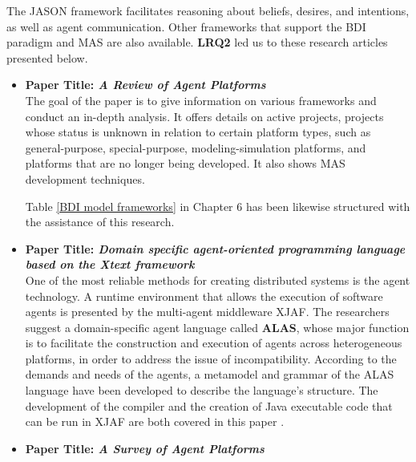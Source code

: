 \vspace{.5cm}

The JASON framework facilitates reasoning about beliefs, desires, and intentions, as well as agent communication. Other frameworks that support the BDI paradigm and MAS are also available. \textbf{LRQ2} led us to these research articles presented below.

\begin{itemize}[label={}]

\item \textbf{Paper Title: \textit{A Review of Agent Platforms}}\\

The goal of the paper \cite{review} is to give information on various frameworks and conduct an in-depth analysis. It offers details on active projects, projects whose status is unknown in relation to certain platform types, such as general-purpose, special-purpose, modeling-simulation platforms, and platforms that are no longer being developed. It also shows MAS development techniques.

\vspace{.5cm}

Table \ref{BDI model frameworks} in Chapter 6 has been likewise structured with the assistance of this research.

\vspace{.5cm}

\item \textbf{Paper Title: \textit{Domain specific agent-oriented programming language based on the Xtext framework}} \\

One of the most reliable methods for creating distributed systems is the agent technology. A runtime environment that allows the execution of software agents is presented by the multi-agent middleware XJAF. The researchers suggest a domain-specific agent language called \textbf{ALAS}, whose major function is to facilitate the construction and execution of agents across heterogeneous platforms, in order to address the issue of incompatibility. According to the demands and needs of the agents, a metamodel and grammar of the ALAS language have been developed to describe the language's structure. The development of the compiler and the creation of Java executable code that can be run in XJAF are both covered in this paper \cite{xtext}.

\vspace{.5cm}

\item \textbf{Paper Title: \textit{A Survey of Agent Platforms}}\\


\end{itemize}
